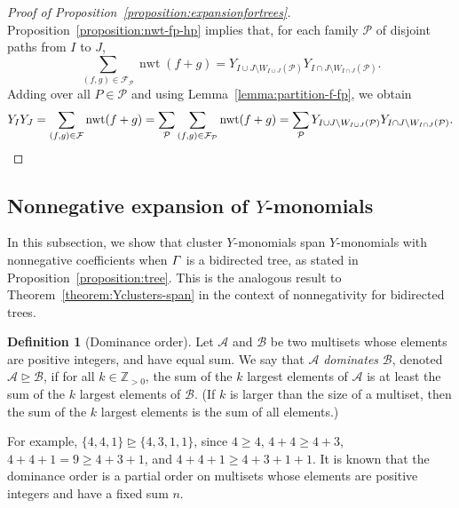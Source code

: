 \documentclass[11pt]{article}
\theoremstyle{definition}
\newtheorem{defi}[theo]{Definition}
\numberwithin{equation}{section}
\newcommand{\positiveintegers}{\mathbb{Z}_{>0}}
\DeclareMathOperator{\normalizedweight}{nwt}
\begin{document}
\begin{proof}[Proof of Proposition~\ref{proposition:expansionfortrees}]
    Proposition~\ref{proposition:nwt-fp-hp} implies that, for each family \(\mathcal{P}\) of disjoint paths from \(I\) to \(J\),
    \begin{equation*}
        \sum_{(f,g) \in \mathcal{F}_{\mathcal{P}}} \normalizedweight(f+g)
        =
        Y_{I \cup J \setminus W_{I \cup J}(\mathcal{P})}
        Y_{I \cap J \setminus W_{I \cap J}(\mathcal{P})}.
    \end{equation*}
    Adding over all \(P \in \mathcal{P}\) and using Lemma~\ref{lemma:partition-f-fp}, we obtain
    \begin{equation*}
        Y_IY_J
        =
        \sum_{(f,g) \in \mathcal{F}} \normalizedweight(f+g)
        =
        \sum_{\mathcal{P}} \sum_{(f,g) \in \mathcal{F}_{\mathcal{P}}} \normalizedweight(f+g)
        =
        \sum_{\mathcal{P}} Y_{I \cup J \setminus W_{I \cup J}(\mathcal{P})}Y_{I \cap J \setminus W_{I \cap J}(\mathcal{P})}. \qedhere
    \end{equation*}
\end{proof}

\subsection{Nonnegative expansion of \texorpdfstring{\(Y\)}{Y}-monomials}\label{subsection:nonnegativeexpansionofY}

In this subsection, we show that cluster \(Y\)-monomials span \(Y\)-monomials with nonnegative coefficients when \(\varGamma\) is a bidirected tree, as stated in Proposition~\ref{proposition:tree}.
This is the analogous result to Theorem~\ref{theorem:Yclusters-span} in the context of nonnegativity for bidirected trees.

\begin{defi}[Dominance order]
    Let \(\mathcal{A}\) and \(\mathcal{B}\) be two multisets whose elements are positive integers,
    and have equal sum.
    We say that \(\mathcal{A}\) \emph{dominates} \(\mathcal{B}\),
    denoted \(\mathcal{A} \trianglerighteq \mathcal{B}\), if for all \(k \in \positiveintegers\),
    the sum of the \(k\) largest elements of \(\mathcal{A}\) is
    at least the sum of the \(k\) largest elements of \(\mathcal{B}\).
    (If \(k\) is larger than the size of a multiset, then the sum of the \(k\) largest elements is the sum of all elements.)
\end{defi}

For example, \(\{4, 4, 1\} \trianglerighteq \{4, 3, 1, 1\}\), since \(4 \geq 4\), \(4 + 4 \geq 4 + 3\), \(4 + 4 + 1 = 9 \geq 4 + 3 + 1\), and \(4 + 4 + 1 \geq 4 + 3 + 1 + 1 \).
It is known that the dominance order is a partial order on multisets whose elements are positive integers and have a fixed sum \(n\).
\end{document}
